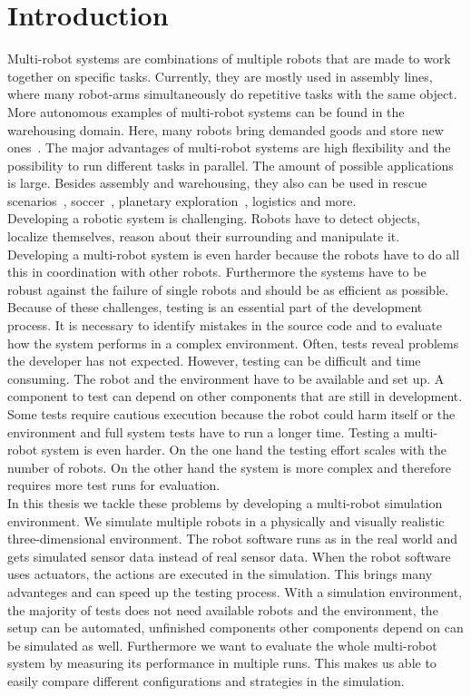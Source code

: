 \chapter{Introduction}

Multi-robot systems are combinations of multiple robots that are made to work together on specific tasks. Currently, they are mostly used in assembly lines, where many robot-arms simultaneously do repetitive tasks with the same object. More autonomous examples of multi-robot systems can be found in the warehousing domain. Here, many robots bring demanded goods and store new ones~\cite{Kiva}. The major advantages of multi-robot systems are high flexibility and the possibility to run different tasks in parallel. The amount of possible applications is large. Besides assembly and warehousing, they also can be used in rescue scenarios~\cite{mas_rescue}, soccer~\cite{mas_soccer}, planetary exploration~\cite{mas_space}, logistics and more.\\
Developing a robotic system is challenging. Robots have to detect objects, localize themselves, reason about their surrounding and manipulate it. Developing a multi-robot system is even harder because the robots have to do all this in coordination with other robots. Furthermore the systems have to be robust against the failure of single robots and should be as efficient as possible. Because of these challenges, testing is an essential part of the development process. It is necessary to identify mistakes in the source code and to evaluate how the system performs in a complex environment. Often, tests reveal problems the developer has not expected. However, testing can be difficult and time consuming. The robot and the environment have to be available and set up. A component to test can depend on other components that are still in development. Some tests require cautious execution because the robot could harm itself or the environment and full system tests have to run a longer time. Testing a multi-robot system is even harder. On the one hand the testing effort scales with the number of robots. On the other hand the system is more complex and therefore requires more test runs for evaluation.\\
In this thesis we tackle these problems by developing a multi-robot simulation environment. We simulate multiple robots in a physically and visually realistic three-dimensional environment. The robot software runs as in the real world and gets simulated sensor data instead of real sensor data. When the robot software uses actuators, the actions are executed in the simulation. This brings many advanteges and can speed up the testing process. With a simulation environment, the majority of tests does not need available robots and the environment, the setup can be automated, unfinished components other components depend on can be simulated as well. Furthermore we want to evaluate the whole multi-robot system by measuring its performance in multiple runs. This makes us able to easily compare different configurations and strategies in the simulation.\\
